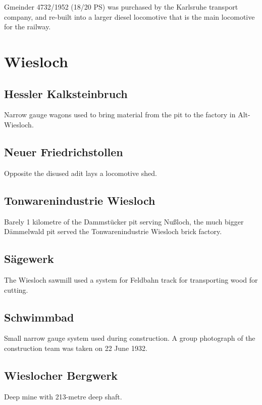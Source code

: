 \documentclass[a4paper]{report}
\begin{document}
Gmeinder 4732/1952 (18/20 PS) was purchased by the Karlsruhe transport
company, and re-built into a larger diesel locomotive that is the main
locomotive for the railway.\cite{Dickinson-2014-06-01}


\section{Wiesloch}

\subsection{Hessler Kalksteinbruch}

Narrow gauge wagons used to bring material from the pit to the factory in Alt-Wiesloch.

\subsection{Neuer Friedrichstollen}

Opposite the disused adit lays a locomotive shed.

\subsection{Tonwarenindustrie Wiesloch}

Barely 1 kilometre of the Dammstücker pit serving Nußloch, the much
bigger Dämmelwald pit served the Tonwarenindustrie Wiesloch brick
factory.

\subsection{Sägewerk}

The Wiesloch sawmill used a system for Feldbahn track for transporting wood for cutting.

\subsection{Schwimmbad}

Small narrow gauge system used during construction.  A group
photograph of the construction team was taken on 22 June
1932.\cite[p.107]{Kurz-Mohr-1996}

\subsection{Wieslocher Bergwerk}

Deep mine with 213-metre deep shaft.\cite[p.49]{Kurz-Mohr-1996}
\end{document}
